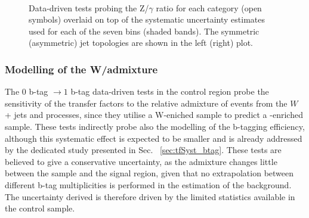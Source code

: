 \begin{figure}[h!]
  \begin{center}
    ~~
    \caption{Data-driven tests probing the Z/$\gamma$ ratio for each
      \njet category (open symbols) overlaid on top of the systematic
      uncertainty estimates used for each of the seven \scalht bins
      (shaded bands). 
      The symmetric (asymmetric) jet topologies are shown in the left (right) plot.      
    }
    \label{fig:closurePhoToMuMu}
  \end{center} 
\end{figure}





\subsubsection*{Modelling of the W/\ttbar admixture}
\label{sec:tfSyst_WttAd}
The $0$ b-tag $\rightarrow1$ b-tag data-driven tests in the \mj control region 
probe the sensitivity of the transfer factors to the relative
admixture of events from the $W$ + jets and \ttbar processes, 
since they utilise a W-eniched sample to predict a \ttbar-enriched sample. 
These tests indirectly probe also the modelling of the b-tagging efficiency, 
although this systematic effect is expected to be smaller and is already addressed 
by the dedicated study presented in Sec. ~\ref{sec:tfSyst_btag}.
These tests are believed to give a conservative uncertainty, 
as the admixture changes little between the \mj sample and the signal region, 
given that no extrapolation between different b-tag multiplicities is performed 
in the estimation of the background. 
The uncertainty derived is therefore driven by the limited statistics available in the control sample.

